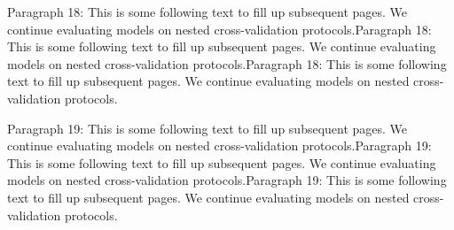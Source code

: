 \documentclass{IEEEtran}
\begin{document}
Paragraph 18: This is some following text to fill up subsequent pages. We continue evaluating models on nested cross-validation protocols.Paragraph 18: This is some following text to fill up subsequent pages. We continue evaluating models on nested cross-validation protocols.Paragraph 18: This is some following text to fill up subsequent pages. We continue evaluating models on nested cross-validation protocols.

Paragraph 19: This is some following text to fill up subsequent pages. We continue evaluating models on nested cross-validation protocols.Paragraph 19: This is some following text to fill up subsequent pages. We continue evaluating models on nested cross-validation protocols.Paragraph 19: This is some following text to fill up subsequent pages. We continue evaluating models on nested cross-validation protocols.
\end{document}
